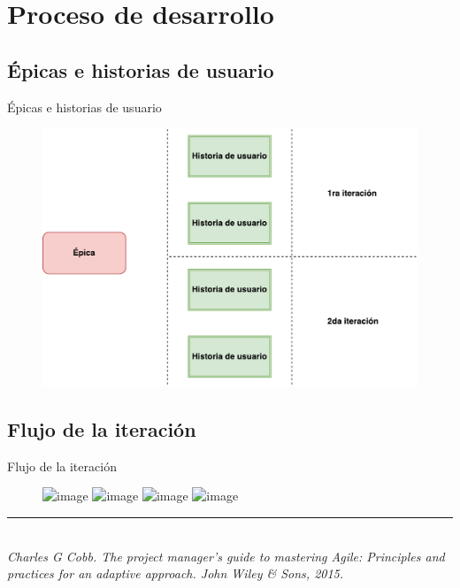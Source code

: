 \documentclass[10pt,xcolor=table ]{beamer}
\newcommand{\decoRule}{\rule{\textwidth}{.4pt}} %
\begin{document}
\section{Proceso de desarrollo}
\subsection{Épicas e historias de usuario}
\begin{frame}{Épicas e historias de usuario}
	\begin{figure}
		\centering
	    \includegraphics[scale=0.5]{../Figuras/epic_diagram}
	\end{figure}
\end{frame}

\subsection{Flujo de la iteración}
\begin{frame}{Flujo de la iteración}
	\begin{figure}
		\centering
		\includegraphics<1>[scale=0.235]{../Figuras/flujo_scrum_1}
		\includegraphics<2>[scale=0.235]{../Figuras/flujo_scrum_2}
		\includegraphics<3>[scale=0.235]{../Figuras/flujo_scrum_3}
		\includegraphics<4>[scale=0.235]{../Figuras/flujo_scrum_4}
	\end{figure}
	\decoRule \\
  	\tiny \textit{Charles G Cobb. The project manager’s guide to mastering Agile: Principles and practices for an adaptive approach. John Wiley \& Sons, 2015.} \\
\end{frame}
\end{document}

